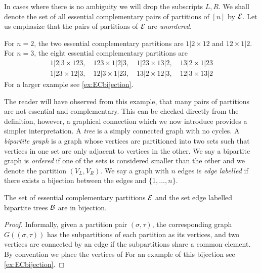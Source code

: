 In cases where there is no ambiguity we will drop the subscripts $L,R$.
We shall denote the set of all essential complementary pairs of partitions of $[n]$ by $\mathcal{E}$.
Let us emphasize that the pairs of partitions of $\mathcal{E}$ are \emph{unordered}.


\begin{example}
For $n=2$, the two essential complementary partitions are $1|2 \times 12$ and $12 \times 1|2$. For $n=3$, the eight essential complementary partitions are
\begin{align*}
	1|2|3 \times 123,\quad 
	123 \times 1|2|3,\quad 
	1|23 \times 13|2,\quad 
	13|2 \times 1|23\\
	1|23 \times 12|3,\quad 
	12|3 \times 1|23,\quad 
	13|2 \times 12|3,\quad 
	12|3 \times 13|2
\end{align*}
For a larger example see \cref{ex:ECbijection}. 
\end{example}

The reader will have observed from this example, that many pairs of partitions are not essential and complementary.
This can be checked directly from the definition, however, a graphical connection which we now introduce provides a simpler interpretation.
A \emph{tree} is a simply connected graph with no cycles. 
A \emph{bipartite graph} is a graph whose vertices are partitioned into two sets such that vertices in one set are only adjacent to vertices in the other.
We say a bipartite graph is \emph{ordered} if one of the sets is considered smaller than the other and we denote the partition $(V_L,V_R)$. 
We say a graph with $n$ edges is \emph{edge labelled} if there exists a bijection between the edges and $\{1,\dots,n\}$.

\begin{proposition}  
\label{EC Graph Bijection}
The set of essential complementary partitions $\mathcal{E}$ and the set edge labelled bipartite trees $\mathcal{B}$ are in bijection.
\end{proposition}
\begin{proof}
Informally, given a partition pair $(\sigma,\tau)$, the corresponding graph $G((\sigma,\tau))$ has the subpartitions of each partition as its vertices, and two vertices are connected by an edge if the subpartitions share a common element. By convention we place the vertices of 
For an example of this bijection see \cref{ex:ECbijection}.
\end{proof}

